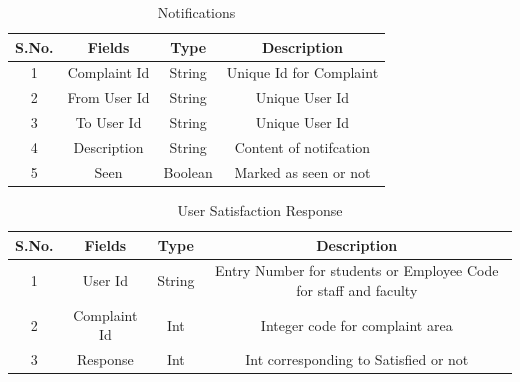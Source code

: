 \documentclass{article}
\begin{document}
\begin{table}[H]
\centering
\caption{Notifications}
\label{my-label}
\begin{tabular}{|c|c|c|c|}
\hline
\textbf{S.No.} & \textbf{Fields} & \textbf{Type} & \textbf{Description}    \\ \hline
1              & Complaint Id    & String        & Unique Id for Complaint \\ \hline
2              & From User Id    & String        & Unique User Id          \\ \hline
3              & To User Id      & String        & Unique User Id          \\ \hline
4              & Description     & String        & Content of notifcation  \\ \hline
5              & Seen            & Boolean       & Marked as seen or not   \\ \hline
\end{tabular}
\end{table}


\begin{table}[H]
\centering
\caption{User Satisfaction Response}
\label{my-label}
\begin{tabular}{|c|c|c|c|}
\hline
\textbf{S.No.} & \textbf{Fields} & \textbf{Type} & \textbf{Description}                                             \\ \hline
1              & User Id         & String        & Entry Number for students or Employee Code for staff and faculty \\ \hline
2              & Complaint Id    & Int           & Integer code for complaint area                                  \\ \hline
3              & Response         & Int           & Int corresponding to Satisfied or not 				           \\ \hline
\end{tabular}
\end{table}
\end{document}
